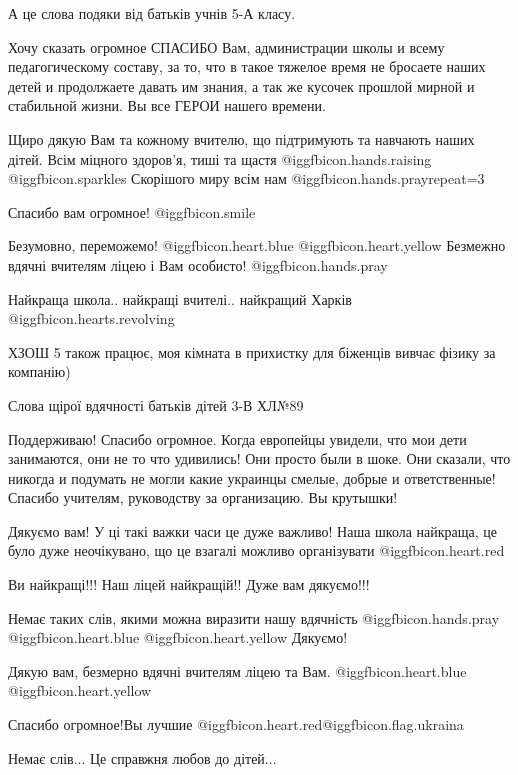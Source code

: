 \begin{itemize}

А це слова подяки від батьків учнів 5-А класу.

Хочу сказать огромное СПАСИБО Вам, администрации школы и всему педагогическому
составу, за то, что в такое тяжелое время не бросаете наших детей и продолжаете
давать им знания, а так же кусочек прошлой мирной и стабильной жизни. Вы все
ГЕРОИ нашего времени.


Щиро дякую Вам та кожному вчителю, що підтримують та навчають наших дітей. Всім
міцного здоров'я, тиші та щастя  @igg{fbicon.hands.raising}  @igg{fbicon.sparkles}  Скорішого миру всім нам  @igg{fbicon.hands.pray}{repeat=3} 

Спасибо вам огромное!  @igg{fbicon.smile} 

Безумовно, переможемо! @igg{fbicon.heart.blue}  @igg{fbicon.heart.yellow} 
Безмежно вдячні вчителям ліцею і Вам особисто! @igg{fbicon.hands.pray} 🏻 ❤ ️ 

Найкраща школа.. найкращі вчителі.. найкращий Харків @igg{fbicon.hearts.revolving} 

ХЗОШ 5 також працює, моя кімната в прихистку для біженців вивчає фізику за компанію)

Слова щірої вдячності батьків дітей 3-В ХЛ№89

Поддерживаю! Спасибо огромное. Когда европейцы увидели, что мои дети
занимаются, они не то что удивились! Они просто были в шоке. Они сказали, что
никогда и подумать не могли какие украинцы смелые, добрые и ответственные!
Спасибо учителям, руководству за организацию. Вы крутышки!


Дякуємо вам! У ці такі важки часи це дуже важливо! Наша школа найкраща, це було
дуже неочікувано, що це взагалі можливо організувати @igg{fbicon.heart.red}

Ви найкращі!!! Наш ліцей найкращій!! Дуже вам дякуємо!!!


Немає таких слів, якими можна виразити нашу вдячність  @igg{fbicon.hands.pray}
@igg{fbicon.heart.blue}  @igg{fbicon.heart.yellow}  Дякуємо!

Дякую вам, безмерно вдячні вчителям ліцею та Вам.  @igg{fbicon.heart.blue}  @igg{fbicon.heart.yellow} 

Спасибо огромное!Вы лучшие @igg{fbicon.heart.red}@igg{fbicon.flag.ukraina}

Немає слів... Це справжня любов до дітей...

\end{itemize} %
